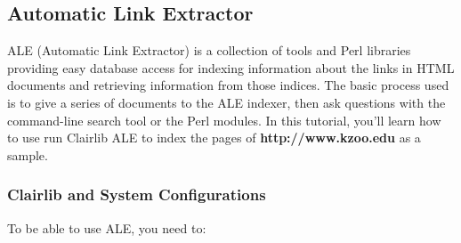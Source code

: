 \subsection{Automatic Link Extractor}

ALE (Automatic Link Extractor) is a collection of tools and Perl libraries providing easy database access for indexing information about the links in HTML documents and retrieving information from those indices. The basic process used is to give a series of documents to the ALE indexer, then ask questions with the command-line search tool or the Perl modules. In this tutorial, you'll learn how to use run Clairlib ALE to index the pages of \textbf{http://www.kzoo.edu} as a sample.

\subsubsection{Clairlib and System Configurations}

To be able to use ALE, you need to:

